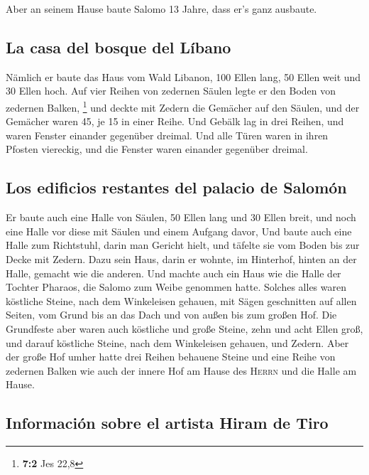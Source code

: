  Aber an seinem Hause baute Salomo 13 Jahre, dass er's
ganz ausbaute.

\hypertarget{la-casa-del-bosque-del-luxedbano}{%
\subsection{La casa del bosque del
Líbano}\label{la-casa-del-bosque-del-luxedbano}}

 Nämlich er baute das Haus vom Wald Libanon, 100 Ellen
lang, 50 Ellen weit und 30 Ellen hoch. Auf vier Reihen von zedernen
Säulen legte er den Boden von zedernen Balken, \footnote{\textbf{7:2}
  Jes 22,8}  und deckte mit Zedern die Gemächer auf den
Säulen, und der Gemächer waren 45, je 15 in einer Reihe. 
Und Gebälk lag in drei Reihen, und waren Fenster einander gegenüber
dreimal.  Und alle Türen waren in ihren Pfosten viereckig,
und die Fenster waren einander gegenüber dreimal.

\hypertarget{los-edificios-restantes-del-palacio-de-salomuxf3n}{%
\subsection{Los edificios restantes del palacio de
Salomón}\label{los-edificios-restantes-del-palacio-de-salomuxf3n}}

 Er baute auch eine Halle von Säulen, 50 Ellen lang und 30
Ellen breit, und noch eine Halle vor diese mit Säulen und einem Aufgang
davor,  Und baute auch eine Halle zum Richtstuhl, darin
man Gericht hielt, und täfelte sie vom Boden bis zur Decke mit Zedern.
 Dazu sein Haus, darin er wohnte, im Hinterhof, hinten an
der Halle, gemacht wie die anderen. Und machte auch ein Haus wie die
Halle der Tochter Pharaos, die Salomo zum Weibe genommen hatte.
 Solches alles waren köstliche Steine, nach dem
Winkeleisen gehauen, mit Sägen geschnitten auf allen Seiten, vom Grund
bis an das Dach und von außen bis zum großen Hof.  Die
Grundfeste aber waren auch köstliche und große Steine, zehn und acht
Ellen groß,  und darauf köstliche Steine, nach dem
Winkeleisen gehauen, und Zedern.  Aber der große Hof
umher hatte drei Reihen behauene Steine und eine Reihe von zedernen
Balken wie auch der innere Hof am Hause des \textsc{Herrn} und die Halle
am Hause.

\hypertarget{informaciuxf3n-sobre-el-artista-hiram-de-tiro}{%
\subsection{Información sobre el artista Hiram de
Tiro}\label{informaciuxf3n-sobre-el-artista-hiram-de-tiro}}

